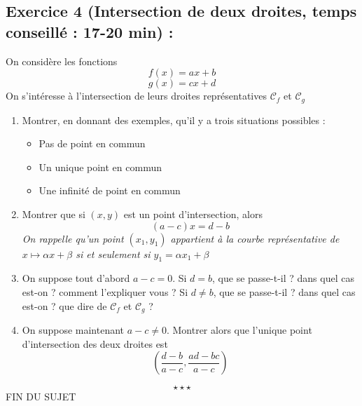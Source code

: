 \subsection*{Exercice 4 (Intersection de deux droites, temps conseillé : 17-20 min) : }
On considère les fonctions $$f(x) = ax+b$$$$g(x) = cx+d$$
On s'intéresse à l'intersection de leurs droites représentatives $\mathscr{C}_f$ et $\mathscr{C}_g$
\begin{enumerate}
\item Montrer, en donnant des exemples, qu'il y a trois situations possibles : \begin{itemize} \item Pas de point en commun \item Un unique point en commun \item Une infinité de point en commun \end{itemize}
\item Montrer que si $(x,y)$ est un point d'intersection, alors 
$$(a-c) x = d-b$$
\emph{On rappelle qu'un point $(x_1,y_1)$ appartient à la courbe représentative de $x\mapsto \alpha x + \beta$ si et seulement si $y_1 = \alpha x_1 + \beta$}
\item On suppose tout d'abord $a-c = 0$. \newline
Si $d =b $, que se passe-t-il ? dans quel cas est-on ? comment l'expliquer vous ?\newline
Si $d \neq b$, que se passe-t-il ? dans quel cas est-on ? que dire de $\mathscr{C}_f$ et $\mathscr{C}_g$ ?
\item On suppose maintenant $a-c \neq 0$. Montrer alors que l'unique point d'intersection des deux droites est $$\left(\frac{d-b}{a-c} ,\frac{ad-bc}{a-c}\right)$$
\end{enumerate}
$$\star \star \star$$
\center
FIN DU SUJET

